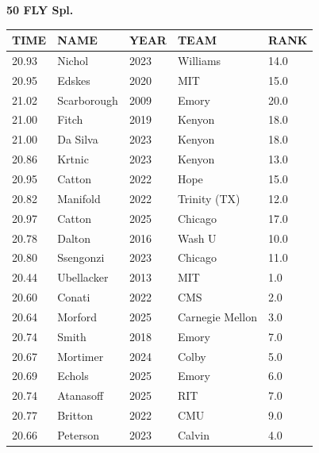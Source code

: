 \begin{table}[H]
\centering
\begin{minipage}[t]{0.6\textwidth}
\centering
\textbf{50 FLY Spl.}\\[0.1cm]
\begin{tabular}{@{}p{1.8cm}p{2.8cm}p{1.2cm}p{1.4cm}p{0.8cm}@{}}
\hline
    \textbf{TIME} & \textbf{NAME} & \textbf{YEAR} & \textbf{TEAM} & \textbf{RANK} \\
\hline
    20.93 & Nichol & 2023 & Williams & 14.0 \\
    20.95 & Edskes & 2020 & MIT & 15.0 \\
    21.02 & Scarborough & 2009 & Emory & 20.0 \\
    21.00 & Fitch & 2019 & Kenyon & 18.0 \\
    21.00 & Da Silva & 2023 & Kenyon & 18.0 \\
    20.86 & Krtnic & 2023 & Kenyon & 13.0 \\
    20.95 & Catton & 2022 & Hope & 15.0 \\
    20.82 & Manifold & 2022 & Trinity (TX) & 12.0 \\
    20.97 & Catton & 2025 & Chicago & 17.0 \\
    20.78 & Dalton & 2016 & Wash U & 10.0 \\
    20.80 & Ssengonzi & 2023 & Chicago & 11.0 \\
    20.44 & Ubellacker & 2013 & MIT & 1.0 \\
    20.60 & Conati & 2022 & CMS & 2.0 \\
    20.64 & Morford & 2025 & Carnegie Mellon & 3.0 \\
    20.74 & Smith & 2018 & Emory & 7.0 \\
    20.67 & Mortimer & 2024 & Colby & 5.0 \\
    20.69 & Echols & 2025 & Emory & 6.0 \\
    20.74 & Atanasoff & 2025 & RIT & 7.0 \\
    20.77 & Britton & 2022 & CMU & 9.0 \\
    20.66 & Peterson & 2023 & Calvin & 4.0 \\
\hline
\end{tabular}
\end{minipage}
\end{table}

